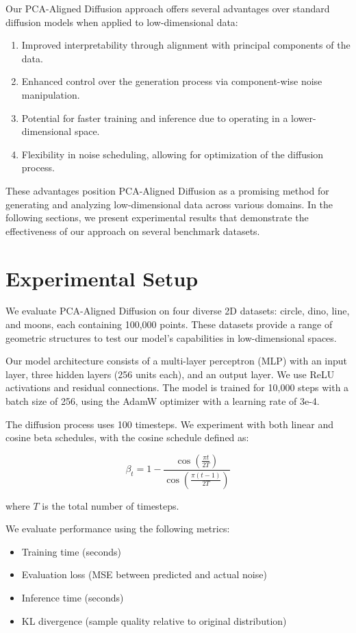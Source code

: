 \documentclass{article} %
\begin{document}
Our PCA-Aligned Diffusion approach offers several advantages over standard diffusion models when applied to low-dimensional data:
\begin{enumerate}
    \item Improved interpretability through alignment with principal components of the data.
    \item Enhanced control over the generation process via component-wise noise manipulation.
    \item Potential for faster training and inference due to operating in a lower-dimensional space.
    \item Flexibility in noise scheduling, allowing for optimization of the diffusion process.
\end{enumerate}

These advantages position PCA-Aligned Diffusion as a promising method for generating and analyzing low-dimensional data across various domains. In the following sections, we present experimental results that demonstrate the effectiveness of our approach on several benchmark datasets.

\section{Experimental Setup}
\label{sec:experimental}

We evaluate PCA-Aligned Diffusion on four diverse 2D datasets: circle, dino, line, and moons, each containing 100,000 points. These datasets provide a range of geometric structures to test our model's capabilities in low-dimensional spaces.

Our model architecture consists of a multi-layer perceptron (MLP) with an input layer, three hidden layers (256 units each), and an output layer. We use ReLU activations and residual connections. The model is trained for 10,000 steps with a batch size of 256, using the AdamW optimizer with a learning rate of 3e-4.

The diffusion process uses 100 timesteps. We experiment with both linear and cosine beta schedules, with the cosine schedule defined as:

\begin{equation}
    \beta_t = 1 - \frac{\cos(\frac{\pi t}{2T})}{\cos(\frac{\pi (t-1)}{2T})}
\end{equation}

where $T$ is the total number of timesteps.

We evaluate performance using the following metrics:
\begin{itemize}
    \item Training time (seconds)
    \item Evaluation loss (MSE between predicted and actual noise)
    \item Inference time (seconds)
    \item KL divergence (sample quality relative to original distribution)
\end{itemize}
\end{document}
